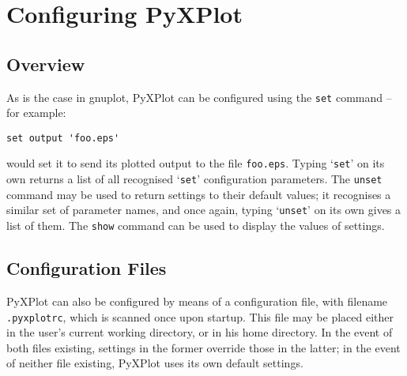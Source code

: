 %
%
%
%
%



\chapter{Configuring PyXPlot}

\section{Overview}

\label{configuration}

As is the case in gnuplot, PyXPlot can be configured using the \noindent
{\tt set} command -- for example:

\begin{verbatim}set output 'foo.eps'\end{verbatim}

\noindent would set it to send its plotted output to the file
{\tt foo.eps}.  Typing `{\tt set}' on its own returns a list of all
recognised `{\tt set}' configuration parameters. The {\tt unset} command
may be used to return settings to their default values; it recognises a similar
set of parameter names, and once again, typing `{\tt unset}' on its own
gives a list of them. The {\tt show} command can be used to display the
values of settings.

\section{Configuration Files}
\label{config_files}

PyXPlot can also be configured by means of a configuration file, with filename
{\tt .pyxplotrc}, which is scanned once upon startup. This file may be
placed either in the user's current working directory, or in his home
directory. In the event of both files existing, settings in the former override
those in the latter; in the event of neither file existing, PyXPlot uses its
own default settings.

